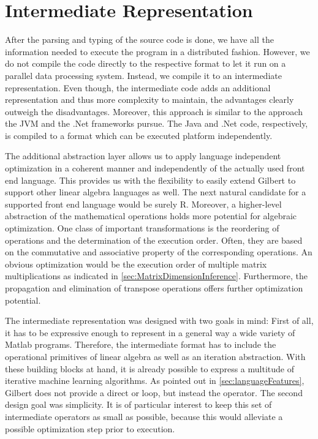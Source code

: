 \chapter{Intermediate Representation}
\label{cha:intermediaterepresentation}


After the parsing and typing of the source code is done, we have all the information needed to execute the program in a distributed fashion.
However, we do not compile the code directly to the respective format to let it run on a parallel data processing system.
Instead, we compile it to an intermediate representation.
Even though, the intermediate code adds an additional representation and thus more complexity to maintain, the advantages clearly outweigh the disadvantages.
Moreover, this approach is similar to the approach the JVM and the .Net frameworks pursue.
The Java and .Net code, respectively, is compiled to a format which can be executed platform independently.

The additional abstraction layer allows us to apply language independent optimization in a coherent manner and independently of the actually used front end language.
This provides us with the flexibility to easily extend Gilbert to support other linear algebra languages as well.
The next natural candidate for a supported front end language would be surely R.
Moreover, a higher-level abstraction of the mathematical operations holds more potential for algebraic optimization.
One class of important transformations is the reordering of operations and the determination of the execution order.
Often, they are based on the commutative and associative property of the corresponding operations.
An obvious optimization would be the execution order of multiple matrix multiplications as indicated in \cref{sec:MatrixDimensionInference}.
Furthermore, the propagation and elimination of transpose operations offers further optimization potential.

The intermediate representation was designed with two goals in mind:
First of all, it has to be expressive enough to represent in a general way a wide variety of Matlab programs.
Therefore, the intermediate format has to include the operational primitives of linear algebra as well as an iteration abstraction.
With these building blocks at hand, it is already possible to express a multitude of iterative machine learning algorithms.
As pointed out in \cref{sec:languageFeatures}, Gilbert does not provide a direct  or  loop, but instead the  operator.
The second design goal was simplicity.
It is of particular interest to keep this set of intermediate operators as small as possible, because this would alleviate a possible optimization step prior to execution.


